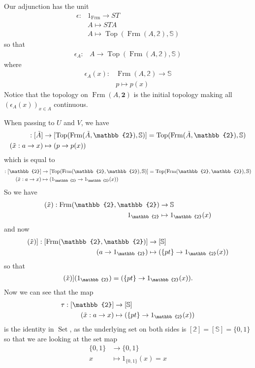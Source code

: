 \documentclass[12pt,a4paper]{article}
\DeclareMathOperator{\Set}{Set}
\DeclareMathOperator{\Frm}{Frm}
\DeclareMathOperator{\Top}{Top}
\def\t{\ensuremath\tilde}
\begin{document}
Our adjunction has the unit
\begin{align*}
	\epsilon:& 1_{\Frm} \to ST\\
	&A \mapsto STA\\
	&A \mapsto \Top(\Frm(A, \mathbb{2}), \mathbb{S})
\end{align*}
so that 
\begin{align*}
	\epsilon_A:& A \to \Top(\Frm(A, \mathbb{2}), \mathbb{S})
\end{align*}
where 
\begin{align*}
	\epsilon_A(x):& \Frm(A, \mathbb{2}) \to \mathbb{S}\\
	&p \mapsto p(x)
\end{align*}
Notice that the topology on $\Frm(A, \mathbf{2})$ is the initial topology making all $(\epsilon_A(x))_{x \in A}$ continuous.

When passing to $U$ and $V$, we have
\begin{align*}
	[\epsilon_{\t A}]: [\t A] &\to [\Top(\Frm(\t A, \mathbb{2}), \mathbb{S})] = \Top(\Frm(\t A, \mathbb{2}), \mathbb{S})\\
	(\t x: a \to x) &\mapsto (p \to p(x))
\end{align*}
which is equal to
\begin{align}
	[\epsilon_{\mathbb{2}}]: [\mathbb{2}] &\to [\Top(\Frm(\mathbb{2}, \mathbb{2}), \mathbb{S})] = \Top(\Frm(\mathbb{2}, \mathbb{2}), \mathbb{S})\\
	(\t x: a \to x) &\mapsto (1_{\mathbb{2}} \to 1_{\mathbb{2}}(x))
\end{align}
So we have 
\begin{align*}
	[\epsilon_{\mathbb{2}}](\t x): \Frm(\mathbb{2},\mathbb{2}) &\to \mathbb{S}\\
	1_{\mathbb{2}} &\mapsto 1_{\mathbb{2}}(x)
\end{align*}
and now
\begin{align*}
	[[\epsilon_{\mathbb{2}}](\t x)]: [\Frm(\mathbb{2},\mathbb{2})] &\to [\mathbb{S}]\\
	(a \to 1_{\mathbb{2}}) &\mapsto (\{pt\} \to1_{\mathbb{2}}(x))
\end{align*}
so that 
\begin{align*}
	[[\epsilon_{\mathbb{2}}](\t x)](1_{\mathbb{2}}) = (\{pt\} \to 1_{\mathbb{2}}(x)).
\end{align*}
Now we can see that the map \begin{align*}
	\tau: [\mathbb{2}] &\to [\mathbb{S}]\\
	(\t x: a \to x) &\mapsto (\{pt\} \to 1_{\mathbb{2}}(x))
\end{align*}
is the identity in $\Set$, as the underlying set on both sides is $[\mathbb{2}] = [\mathbb{S}] = \{0,1\}$ so that we are looking at the set map \begin{align*}
	\{0,1\} &\to \{0,1\}\\
	x &\mapsto 1_{\{0,1\}}(x)= x
\end{align*}
\end{document}
